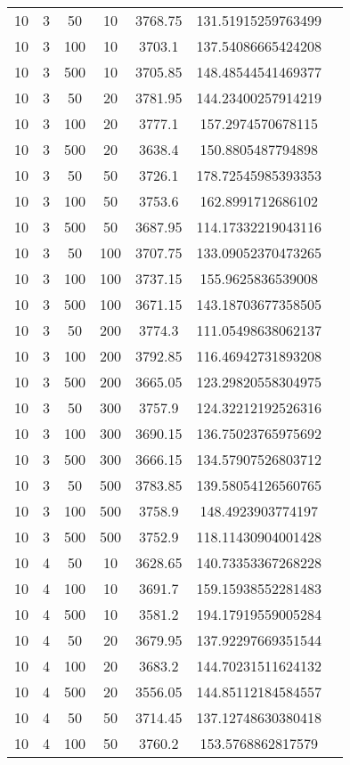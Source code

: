 {\begin{longtabu}{S
S
S
S
S
S[round-mode=places,round-precision=0]
S[round-mode=places,round-precision=0]}
10 & 3 & 50 & 10 & 3768.75 & 131.51915259763499 \\
10 & 3 & 100 & 10 & 3703.1 & 137.54086665424208 \\
10 & 3 & 500 & 10 & 3705.85 & 148.48544541469377 \\
10 & 3 & 50 & 20 & 3781.95 & 144.23400257914219 \\
10 & 3 & 100 & 20 & 3777.1 & 157.2974570678115 \\
10 & 3 & 500 & 20 & 3638.4 & 150.8805487794898 \\
10 & 3 & 50 & 50 & 3726.1 & 178.72545985393353 \\
10 & 3 & 100 & 50 & 3753.6 & 162.8991712686102 \\
10 & 3 & 500 & 50 & 3687.95 & 114.17332219043116 \\
10 & 3 & 50 & 100 & 3707.75 & 133.09052370473265 \\
10 & 3 & 100 & 100 & 3737.15 & 155.9625836539008 \\
10 & 3 & 500 & 100 & 3671.15 & 143.18703677358505 \\
10 & 3 & 50 & 200 & 3774.3 & 111.05498638062137 \\
10 & 3 & 100 & 200 & 3792.85 & 116.46942731893208 \\
10 & 3 & 500 & 200 & 3665.05 & 123.29820558304975 \\
10 & 3 & 50 & 300 & 3757.9 & 124.32212192526316 \\
10 & 3 & 100 & 300 & 3690.15 & 136.75023765975692 \\
10 & 3 & 500 & 300 & 3666.15 & 134.57907526803712 \\
10 & 3 & 50 & 500 & 3783.85 & 139.58054126560765 \\
10 & 3 & 100 & 500 & 3758.9 & 148.4923903774197 \\
10 & 3 & 500 & 500 & 3752.9 & 118.11430904001428 \\
10 & 4 & 50 & 10 & 3628.65 & 140.73353367268228 \\
10 & 4 & 100 & 10 & 3691.7 & 159.15938552281483 \\
10 & 4 & 500 & 10 & 3581.2 & 194.17919559005284 \\
10 & 4 & 50 & 20 & 3679.95 & 137.92297669351544 \\
10 & 4 & 100 & 20 & 3683.2 & 144.70231511624132 \\
10 & 4 & 500 & 20 & 3556.05 & 144.85112184584557 \\
10 & 4 & 50 & 50 & 3714.45 & 137.12748630380418 \\
10 & 4 & 100 & 50 & 3760.2 & 153.5768862817579 \\

\end{longtabu}}
